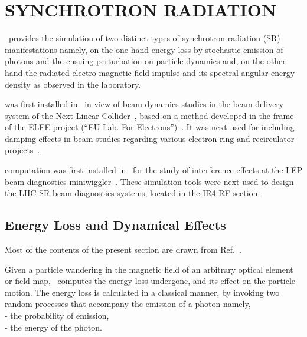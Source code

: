 \clearemptydoublepage

\section{SYNCHROTRON RADIATION }\label{secN4} 

\renewcommand\theequation{\thesubsection.\arabic{equation}}
\makeatletter
{}
\makeatother

\zgoubi\ provides the  simulation of two distinct types of synchrotron radiation (SR) manifestations 
 namely, on the one hand energy loss by stochastic emission of photons and the ensuing perturbation 
on particle dynamics  and, on the other hand the radiated electro-magnetic field impulse and 
its spectral-angular energy density as observed in the laboratory. 

\medskip

 was first installed in \zgou\ in view of beam dynamics studies in the beam delivery system of the 
Next Linear Collider~\cite{FMSEA-00-01}, based on a  method developed in the frame 
of the ELFE project (``EU Lab. For Electrons'')~\cite{SRLossGL,DYNAC,ELFE}. 
It was next used for including damping effects in beam studies 
regarding various electron-ring and recirculator projects~\cite{polarSuperB,SRLossBench}. 

\medskip

 computation was first installed in \zgou\ for the 
study of interference effects at the LEP beam diagnostics miniwiggler~\cite{FMSL/94-22}. 
These simulation tools were next used to design the LHC SR beam diagnostics systems, 
located in the IR4 RF section~\cite{FMLPYellow}. 



\subsection{Energy Loss and  Dynamical Effects}\label{secSRLoss}

Most of the contents of the present section are drawn from Ref.~\cite{FMSEA-00-01}\label{SRLoss}.

\medskip

\noindent Given a particle wandering in the magnetic field of an arbitrary optical element or field 
map, \zgoubi\ computes the energy loss undergone, and its 
effect on the particle motion. The energy loss is calculated  in a  classical manner, by invoking 
two random processes that accompany the emission of a photon  namely, \\
\indent - the probability of emission, \\
\indent - the energy of the photon. 

